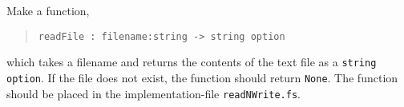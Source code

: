 \label{cat:readFile}
Make a function,
\begin{quote}
  \mbox{\lstinline!readFile : filename:string -> string option!}
\end{quote}
which takes a filename and returns the contents of the text file as a
\lstinline{string option}. If the file does not exist, the function
should return \lstinline{None}. The function should be placed in the
implementation-file \lstinline{readNWrite.fs}.
